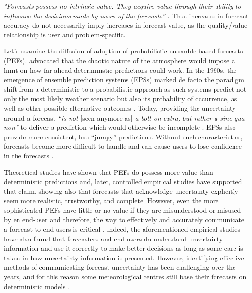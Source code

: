 \documentclass[twocol]{ametsocV5} %
\begin{document}
\textit{"Forecasts possess no intrinsic value. They acquire value through their ability to influence the decisions made by users of the forecasts”} \citep{Murphy1993}. Thus increases in forecast accuracy do not necessarily imply increases in forecast value, as the quality/value relationship is user and problem-specific. \par
Let's examine the diffusion of adoption of probabilistic ensemble-based forecasts (PEFs). \citet{Lorenz1963} advocated that the chaotic nature of the atmosphere would impose a limit on how far ahead deterministic predictions could work. In the 1990s, the emergence of ensemble prediction systems (EPSs) marked de facto the paradigm shift from a deterministic to a probabilistic approach as such systems predict not only the most likely weather scenario but also its probability of occurrence, as well as other possible alternative outcomes \citep{Bauer2015,Buizza2018a,Palmer2019}. Today, providing the uncertainty around a forecast \textit{“is not} [seen anymore as] \textit{a bolt-on extra, but rather a sine qua non”} to deliver a prediction which would otherwise be incomplete \citep{Palmer2017}. EPSs also provide more consistent, less “jumpy” predictions. Without such characteristics, forecasts become more difficult to handle and can cause users to lose confidence in the forecasts \citep{Richardson2020}. \par
Theoretical studies \citep{Richardson2000,Richardson2001,Palmer2002,Zhu2002,Buizza2008} have shown that PEFs do possess more value than deterministic predictions and, later, controlled empirical studies \citep{Roulston2006,Joslyn2007,Roulston2009,Joslyn2010,Joslyn2012,Joslyn2013,Ramos2013,Arnal2016} have supported that claim, showing also that forecasts that acknowledge uncertainty explicitly seem more realistic, trustworthy, and complete. However, even the more sophisticated PEFs have little or no value if they are misunderstood or misused by en end-user and therefore, the way to effectively and accurately communicate a forecast to end-users is critical \citep{Du2007}. Indeed, the aforementioned empirical studies have also found that forecasters and end-users do understand uncertainty information and use it correctly to make better decisions as long as some care is taken in how uncertainty information is presented. However, identifying effective methods of communicating forecast uncertainty has been challenging over the years, and for this reason some meteorological centres still base their forecasts on deterministic models \citep{NationalResearchCouncil2006,AMS2008}. \par
\end{document}
